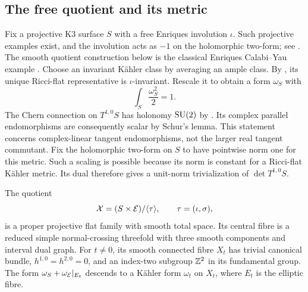 \subsection{The free quotient and its metric}
Fix a projective K3 surface $S$ with a free Enriques involution $\iota$.
Such projective examples exist, and the involution acts as $-1$ on the
holomorphic two-form; see \cite[Example 2.10]{hashimoto-kanazawa}.
The smooth quotient construction below is the classical Enriques
Calabi--Yau example \cite[Example 3.5]{hashimoto-kanazawa}.
Choose an invariant K\"ahler class by averaging an ample class.
By \cite[Theorem 2]{yau}, its unique Ricci-flat representative is
$\iota$-invariant. Rescale it to obtain a form $\omega_S$ with
\begin{equation}\label{eq:k3-volume}
 \int_S\frac{\omega_S^2}{2}=1.
\end{equation}
The Chern connection on $T^{1,0}S$ has holonomy $\operatorname{SU}(2)$ by
\cite[Propositions 1 and 4]{beauville}. Its complex
parallel endomorphisms are consequently scalar by Schur's lemma. This
statement concerns complex-linear tangent endomorphisms, not the larger
real tangent commutant.
Fix the holomorphic two-form on $S$ to have pointwise norm one for this
metric. Such a scaling is possible because its norm is constant for a
Ricci-flat K\"ahler metric. Its dual therefore gives a unit-norm
trivialization of $\det T^{1,0}S$.

\begin{proposition}\label{prop:threefold-family}
The quotient
\begin{equation}\label{eq:threefold-family}
 \mathcal X=(S\times\mathcal E)/\langle\tau\rangle,
 \qquad \tau=(\iota,\sigma),
\end{equation}
is a proper projective flat family with smooth total space. Its central
fibre is a reduced simple normal-crossing threefold with three smooth
components and interval dual graph. For $t\ne0$, its smooth connected
fibre $X_t$ has trivial canonical bundle, $h^{1,0}=h^{2,0}=0$, and an
index-two subgroup $\mathbb Z^2$ in its fundamental group. The form
$\omega_S+\omega_{\mathcal E}|_{E_t}$ descends to a K\"ahler form $\omega_t$ on
$X_t$, where $E_t$ is the elliptic fibre.
\end{proposition}

